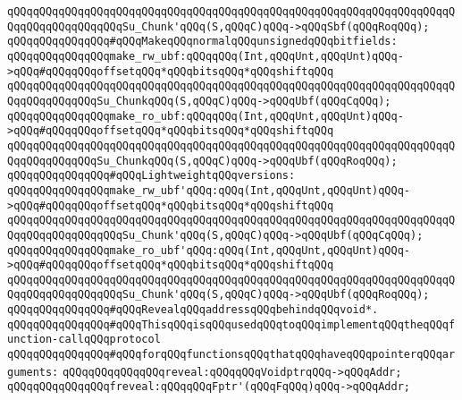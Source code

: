 \verb|qQQqqQQqqQQqqQQqqQQqqQQqqQQqqQQqqQQqqQQqqQQqqQQqqQQqqQQqqQQqqQQqqQQqqQQqqQQqqQQqqQQqqQQqSu_Chunk'qQQq(S,qQQqC)qQQq->qQQqSbf(qQQqRoqQQq);|\newline
\newline
\verb|qQQqqQQqqQQqqQQq#qQQqMakeqQQqnormalqQQqunsignedqQQqbitfields:|\newline
\verb|qQQqqQQqqQQqqQQqmake_rw_ubf:qQQqqQQq(Int,qQQqUnt,qQQqUnt)qQQq->qQQq#qQQqqQQqoffsetqQQq*qQQqbitsqQQq*qQQqshiftqQQq|\newline
\verb|qQQqqQQqqQQqqQQqqQQqqQQqqQQqqQQqqQQqqQQqqQQqqQQqqQQqqQQqqQQqqQQqqQQqqQQqqQQqqQQqqQQqSu_ChunkqQQq(S,qQQqC)qQQq->qQQqUbf(qQQqCqQQq);|\newline
\verb|qQQqqQQqqQQqqQQqmake_ro_ubf:qQQqqQQq(Int,qQQqUnt,qQQqUnt)qQQq->qQQq#qQQqqQQqoffsetqQQq*qQQqbitsqQQq*qQQqshiftqQQq|\newline
\verb|qQQqqQQqqQQqqQQqqQQqqQQqqQQqqQQqqQQqqQQqqQQqqQQqqQQqqQQqqQQqqQQqqQQqqQQqqQQqqQQqqQQqSu_ChunkqQQq(S,qQQqC)qQQq->qQQqUbf(qQQqRoqQQq);|\newline
\newline
\verb|qQQqqQQqqQQqqQQq#qQQqLightweightqQQqversions:|\newline
\verb|qQQqqQQqqQQqqQQqmake_rw_ubf'qQQq:qQQq(Int,qQQqUnt,qQQqUnt)qQQq->qQQq#qQQqqQQqoffsetqQQq*qQQqbitsqQQq*qQQqshiftqQQq|\newline
\verb|qQQqqQQqqQQqqQQqqQQqqQQqqQQqqQQqqQQqqQQqqQQqqQQqqQQqqQQqqQQqqQQqqQQqqQQqqQQqqQQqqQQqqQQqSu_Chunk'qQQq(S,qQQqC)qQQq->qQQqUbf(qQQqCqQQq);|\newline
\verb|qQQqqQQqqQQqqQQqmake_ro_ubf'qQQq:qQQq(Int,qQQqUnt,qQQqUnt)qQQq->qQQq#qQQqqQQqoffsetqQQq*qQQqbitsqQQq*qQQqshiftqQQq|\newline
\verb|qQQqqQQqqQQqqQQqqQQqqQQqqQQqqQQqqQQqqQQqqQQqqQQqqQQqqQQqqQQqqQQqqQQqqQQqqQQqqQQqqQQqqQQqSu_Chunk'qQQq(S,qQQqC)qQQq->qQQqUbf(qQQqRoqQQq);|\newline
\newline
\verb|qQQqqQQqqQQqqQQq#qQQqRevealqQQqaddressqQQqbehindqQQqvoid*.|\newline
\verb|qQQqqQQqqQQqqQQq#qQQqThisqQQqisqQQqusedqQQqtoqQQqimplementqQQqtheqQQqfunction-callqQQqprotocol|\newline
\verb|qQQqqQQqqQQqqQQq#qQQqforqQQqfunctionsqQQqthatqQQqhaveqQQqpointerqQQqarguments:|\newline
\verb|qQQqqQQqqQQqqQQqreveal:qQQqqQQqVoidptrqQQq->qQQqAddr;|\newline
\verb|qQQqqQQqqQQqqQQqfreveal:qQQqqQQqFptr'(qQQqFqQQq)qQQq->qQQqAddr;|\newline
